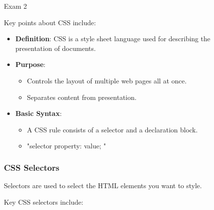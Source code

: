\begin{examnotes}{Exam 2}
    \begin{highlight}
        Key points about CSS include:
        
        \begin{itemize}
            \item \textbf{Definition}: CSS is a style sheet language used for describing the presentation of documents.
            \item \textbf{Purpose}:
                \begin{itemize}
                    \item Controls the layout of multiple web pages all at once.
                    \item Separates content from presentation.
                \end{itemize}
            \item \textbf{Basic Syntax}:
                \begin{itemize}
                    \item A CSS rule consists of a selector and a declaration block.
                    \item "selector { property: value; }"
                \end{itemize}
        \end{itemize}
    \end{highlight}
    
    \subsubsection*{CSS Selectors}
    
    Selectors are used to select the HTML elements you want to style.
    
    \begin{highlight}
        Key CSS selectors include:
        

\end{highlight}
\end{examnotes}
